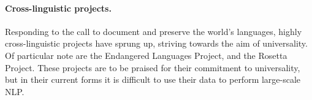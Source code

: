 
\paragraph{Cross-linguistic projects.}

Responding to the call to document and preserve the world's languages, highly cross-linguistic projects have sprung up, striving towards the aim of universality.  Of particular note are the Endangered Languages Project, and the Rosetta Project. These projects are to be praised for their commitment to universality, but in their current forms it is difficult to use their data to perform large-scale NLP.  

